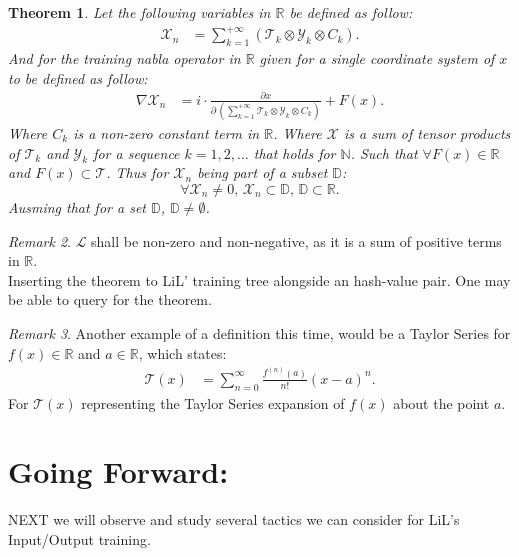 \documentclass[10pt]{article}
\theoremstyle{plain}
\newtheorem{theorem}{Theorem}[section]
\theoremstyle{definition}
\theoremstyle{remark}
\newtheorem{remark}[theorem]{Remark}
\begin{document}
\begin{theorem}
Let the following variables in $\mathbb{R}$ be defined as follow:
\begin{align*}
    \mathcal{X}_n &= \sum_{k=1}^{+\infty} (\mathcal{T}_k \otimes \mathcal{Y}_k \otimes C_k).
\end{align*}
And for the training nabla operator in $\mathbb{R}$ given for a single coordinate system of $x$ to be defined as follow:
\begin{align*}
	\nabla \mathcal{X}_n &= i \cdot \frac{\partial x}{\partial \, (\sum_{k=1}^{+\infty} \mathcal{T}_k \otimes \mathcal{Y}_k \otimes C_k)} + F(x).
\end{align*}
Where $C_k$ is a non-zero constant term in $\mathbb{R}$. Where $\mathcal{X}$ is a sum of tensor products of $\mathcal{T}_k$ and $\mathcal{Y}_k$ for a sequence $k=1, 2, \ldots$ that holds for $\mathbb{N}$. Such that $\forall F(x) \in \mathbb{R}$ and $F(x) \subset \mathcal{T}$. Thus for $\mathcal{X}_n$ being part of a subset $\mathbb{D}$:
\begin{equation}
	\forall \mathcal{X}_n \neq 0, \, \mathcal{X}_n \subset \mathbb{D}, \, \mathbb{D} \subset \mathbb{R}.
\end{equation}
Ausming that for a set $\mathbb{D}$, $\mathbb{D} \neq \emptyset$.
\end{theorem}

\begin{remark}
    $\mathcal{L}$ shall be non-zero and non-negative, as it is a sum of positive terms in $\mathbb{R}$.\\
	Inserting the theorem to LiL' training tree alongside an hash-value pair. One may be able to query for the theorem.
\end{remark}

\begin{remark}
	Another example of a definition this time, would be a Taylor Series for $f(x) \in \mathbb{R}$ and $a \in \mathbb{R}$, which states:
	\begin{align*}
		\mathcal{T}(x) &= \sum_{n=0}^{\infty} \frac{f^{(n)}(a)}{n!} (x-a)^n.
	\end{align*}
	For $\mathcal{T}(x)$ representing the Taylor Series expansion of $f(x)$ about the point $a$.
\end{remark}

\section{Going Forward:}

\lettrine[lines=1, lhang=0.1, loversize=0.2]{N}EXT we will observe and study several tactics we can consider for LiL's Input/Output training.

\nocite{*}

\nocite{*}



\end{document}
